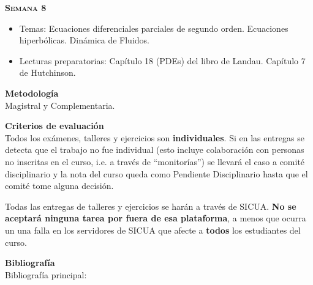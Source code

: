 \documentclass[letterpaper,10pt,onecolumn]{article}
\begin{document}
\noindent\textbf{\textsc{Semana 8}}\\[-0.5cm]
\begin{itemize}
\item Temas: Ecuaciones diferenciales parciales de segundo orden. Ecuaciones hiperbólicas. Din\'amica de Fluidos. \\[-0.6cm]
\item Lecturas preparatorias: Cap\'itulo 18 (PDEs) del libro de
  Landau. Cap\'itulo 7 de Hutchinson. \\[-0.6cm] 
\end{itemize}


\vspace*{0.5cm} 
\noindent\textbf{\large {} \quad
  Metodolog\'ia}\\[-0.2cm] 


\noindent\normalsize 
Magistral y Complementaria.


\vspace*{0.5cm} 
\noindent\textbf{\large {} \quad Criterios de
  evaluaci\'on}\\[-0.2cm] 

Todos los ex\'amenes, talleres y ejercicios son
\textbf{individuales}.  
Si en las entregas se detecta que el trabajo no fue
individual (esto incluye colaboraci\'on con personas no inscritas en
el curso, i.e. a trav\'es de ``monitor\'ias'') se llevar\'a el caso a
comit\'e disciplinario y la nota del curso queda como Pendiente
Disciplinario hasta que el comit\'e tome alguna decisi\'on. 

Todas las entregas de talleres y ejercicios se har\'an a trav\'es de
SICUA.  {\bf No se aceptar\'a ninguna tarea por fuera de esa
  plataforma}, a menos que ocurra un una falla en los servidores de
SICUA que afecte a {\bf todos} los estudiantes del curso.


\vspace*{0.5cm} 

\noindent\textbf{\large {} \quad
  Bibliograf\'ia}\\[-0.2cm] 



\noindent\normalsize Bibliograf\'ia principal:
\end{document}
